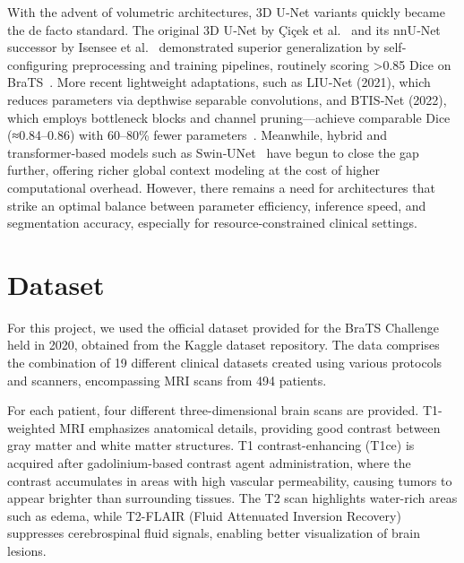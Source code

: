 \documentclass[10pt,twocolumn,letterpaper]{article}
\begin{document}
With the advent of volumetric architectures, 3D U‐Net variants quickly became the de facto standard. The original 3D U‐Net by Çiçek et al.~\cite{çiçek20163dunetlearningdense} and its nnU‐Net successor by Isensee et al.~\cite{isensee2020nnunetbraintumorsegmentation} demonstrated superior generalization by self‐configuring preprocessing and training pipelines, routinely scoring >0.85 Dice on BraTS~\cite{dong2017automatic,bukhari2021e1d3,myronenko2019robust}. More recent lightweight adaptations, such as LIU‐Net (2021), which reduces parameters via depthwise separable convolutions, and BTIS‐Net (2022), which employs bottleneck blocks and channel pruning—achieve comparable Dice (≈0.84–0.86) with 60–80\% fewer parameters~\cite{Liu2024BTIS,Ahmad2025liu}. Meanwhile, hybrid and transformer‐based models such as Swin‐UNet~\cite{cao2021swinunetunetlikepuretransformer} have begun to close the gap further, offering richer global context modeling at the cost of higher computational overhead. However, there remains a need for architectures that strike an optimal balance between parameter efficiency, inference speed, and segmentation accuracy, especially for resource‐constrained clinical settings.


\section{Dataset}
For this project, we used the official dataset\cite{BraTSdataset} provided for the BraTS Challenge held in 2020, obtained from the Kaggle dataset repository. The data comprises the combination of 19 different clinical datasets created using various protocols and scanners, encompassing MRI scans from 494 patients.

For each patient, four different three-dimensional brain scans are provided. T1-weighted MRI emphasizes anatomical details, providing good contrast between gray matter and white matter structures. T1 contrast-enhancing (T1ce) is acquired after gadolinium-based contrast agent administration, where the contrast accumulates in areas with high vascular permeability, causing tumors to appear brighter than surrounding tissues. The T2 scan highlights water-rich areas such as edema, while T2-FLAIR (Fluid Attenuated Inversion Recovery) suppresses cerebrospinal fluid signals, enabling better visualization of brain lesions.
\end{document}
